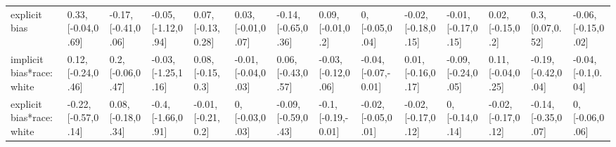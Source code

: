 \documentclass[english,floatsintext,man]{apa6}
\newenvironment{lltable}
  {\begin{landscape}\begin{center}\begin{ThreePartTable}}
  {\end{ThreePartTable}\end{center}\end{landscape}}
\theoremstyle{definition}
\theoremstyle{definition}
\theoremstyle{remark}
\begin{document}
\begin{lltable}
{\begin{longtable}{llllllllllllll}
explicit bias & 0.33, [-0.04,0.69] & -0.17, [-0.41,0.06] & -0.05, [-1.12,0.94] & 0.07, [-0.13,0.28] & 0.03, [-0.01,0.07] & -0.14, [-0.65,0.36] & 0.09, [-0.01,0.2] & 0, [-0.05,0.04] & -0.02, [-0.18,0.15] & -0.01, [-0.17,0.15] & 0.02, [-0.15,0.2] & 0.3, [0.07,0.52] & -0.06, [-0.15,0.02]\\
implicit bias*race: white & 0.12, [-0.24,0.46] & 0.2, [-0.06,0.47] & -0.03, [-1.25,1.16] & 0.08, [-0.15,0.3] & -0.01, [-0.04,0.03] & 0.06, [-0.43,0.57] & -0.03, [-0.12,0.06] & -0.04, [-0.07,-0.01] & 0.01, [-0.16,0.17] & -0.09, [-0.24,0.05] & 0.11, [-0.04,0.25] & -0.19, [-0.42,0.04] & -0.04, [-0.1,0.04]\\
explicit bias*race: white & -0.22, [-0.57,0.14] & 0.08, [-0.18,0.34] & -0.4, [-1.66,0.91] & -0.01, [-0.21,0.2] & 0, [-0.03,0.03] & -0.09, [-0.59,0.43] & -0.1, [-0.19,-0.01] & -0.02, [-0.05,0.01] & -0.02, [-0.17,0.12] & 0, [-0.14,0.14] & -0.02, [-0.17,0.12] & -0.14, [-0.35,0.07] & 0, [-0.06,0.06]\\
\bottomrule
\end{longtable}
}
\end{lltable}
\end{document}
